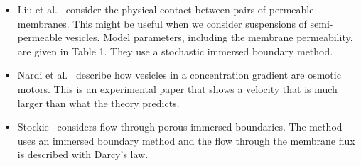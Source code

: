 \documentclass[twoside,twocolumn,9pt]{article}
\begin{document}
\begin{itemize}
  \item Liu et al.~\cite{liu-chu-new-rea-low-all2019} consider the
    physical contact between pairs of permeable membranes. This might be
    useful when we consider suspensions of semi-permeable vesicles.
    Model parameters, including the membrane permeability, are given in
    Table 1. They use a stochastic immersed boundary method.

  \item Nardi et al.~\cite{nar-bru-sac1999} describe how vesicles in a
    concentration gradient are osmotic motors. This is an experimental
    paper that shows a velocity that is much larger than what the theory
    predicts.

  \item Stockie~\cite{sto2009} considers flow through porous immersed
    boundaries. The method uses an immersed boundary method and the flow
    through the membrane flux is described with Darcy's law.






\end{itemize}

\end{document}
